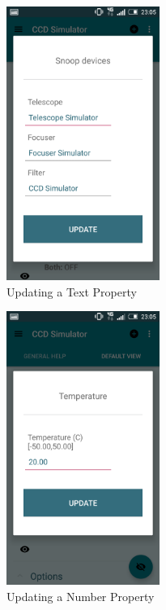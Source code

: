 \begin{figure}
 \centering
 \includegraphics[width=5cm]{../images/updateText2.png}
 \caption{Updating a Text Property}
 \label{fig:updateText}
\end{figure}
                
\begin{figure}
 \centering
 \includegraphics[width=5cm]{../images/updateNumber2.png}
 \caption{Updating a Number Property}
 \label{fig:updateNumber}
\end{figure}
                

